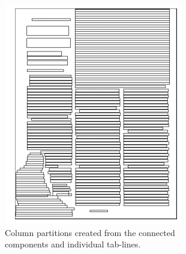 \begin{figure}[p]
\begin{subfigure}{0.30\textwidth}
\includegraphics[width=\linewidth]{img/tabStopDetection/tessPageSegm3.png}
\caption{Column partitions created from the connected components and individual tab-lines.}
\label{fig:segmentationTesseract3}
\end{subfigure}
\\
\begin{subfigure}{0.30\textwidth}

\end{subfigure}
\end{figure}
